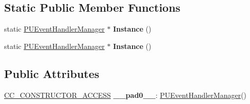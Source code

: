 \subsection*{Static Public Member Functions}
\begin{DoxyCompactItemize}
\item 
\mbox{\label{classPUEventHandlerManager_a3f2490ff314ad78caf78348af6ab8c2f}} 
static \hyperlink{classPUEventHandlerManager}{P\+U\+Event\+Handler\+Manager} $\ast$ {\bfseries Instance} ()
\item 
\mbox{\label{classPUEventHandlerManager_a3743cc57af016a608f15d0f5cef0d136}} 
static \hyperlink{classPUEventHandlerManager}{P\+U\+Event\+Handler\+Manager} $\ast$ {\bfseries Instance} ()
\end{DoxyCompactItemize}
\subsection*{Public Attributes}
\begin{DoxyCompactItemize}
\item 
\mbox{\label{classPUEventHandlerManager_a7e1b2894a6d077dab8d00d60fd4371a6}} 
\hyperlink{_2cocos2d_2cocos_2base_2ccConfig_8h_a25ef1314f97c35a2ed3d029b0ead6da0}{C\+C\+\_\+\+C\+O\+N\+S\+T\+R\+U\+C\+T\+O\+R\+\_\+\+A\+C\+C\+E\+SS} {\bfseries \+\_\+\+\_\+pad0\+\_\+\+\_\+}\+: \hyperlink{classPUEventHandlerManager}{P\+U\+Event\+Handler\+Manager}()
\end{DoxyCompactItemize}
